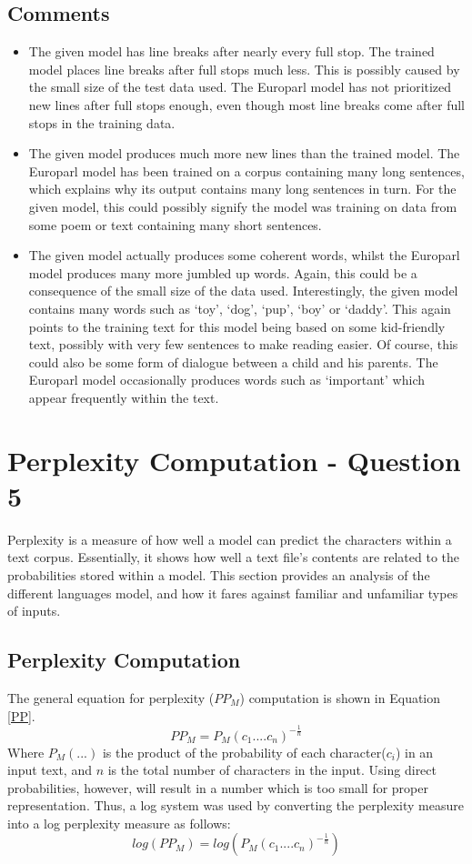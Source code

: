 \documentclass[12pt]{article}
\begin{document}
\subsection{Comments}
\begin{itemize}
	\item  The given model has line breaks after nearly every full stop.  The trained model places line breaks after full stops much less.  This  is possibly caused by the small size of the test data used.  The Europarl model has not prioritized new lines after full stops enough, even though most line breaks come after full stops in the training data. 
	\item  The given model produces much more new lines than the trained model.  The Europarl model has been trained on a corpus containing many long sentences, which explains why its output contains many long sentences in turn.  For the given model, this could possibly signify the model was training on data from some poem or text containing many short sentences.
	\item The given model actually produces some coherent words, whilst the Europarl model produces many more jumbled up words.  Again, this could be a consequence of the small size of the data used.  Interestingly, the given model contains many words such as `toy', `dog', `pup', `boy' or `daddy'.  This again points to the training text for this model being based on some kid-friendly text, possibly with very few sentences to make reading easier.  Of course, this could also be some form of dialogue between a child and his parents.  The Europarl model occasionally produces words such as `important' which appear frequently within the text.
\end{itemize}
\section{Perplexity Computation - Question 5}
Perplexity is a measure of how well a model can predict the characters within a text corpus.  Essentially, it shows how well a text file's contents are related to the probabilities stored within a model.  This section provides an analysis of the different languages model, and how it fares against familiar and unfamiliar types of inputs.
\subsection{Perplexity Computation}
The general equation for perplexity ($PP_{M}$) computation is shown in Equation \ref{PP}.
\begin{equation}\label{PP}
	PP_{M} = P_{M}\left( c_{1}.... c_{n}\right)^{-\frac{1}{n}}
\end{equation}
Where $P_{M}(...)$ is the product of the probability of each character($c_{i}$) in an input text, and $n$ is the total number of characters in the input.  Using direct probabilities, however, will result in a number which is too small for  proper representation.  Thus, a log system was used by converting the perplexity measure into a log perplexity measure as follows:
\[log\left(PP_{M}\right) = log\left(P_{M}\left( c_{1}.... c_{n}\right)^{-\frac{1}{n}}\right)\]
\end{document}

